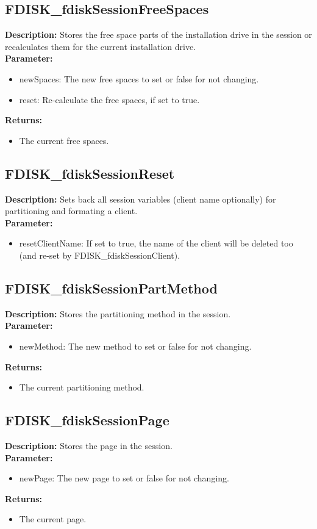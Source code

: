 \subsection{FDISK\_fdiskSessionFreeSpaces}
\textbf{Description:} Stores the free space parts of the installation drive in the session or recalculates them for the current installation drive.\\
\textbf{Parameter:}
\begin{itemize}
\item newSpaces: The new free spaces to set or false for not changing.
\item reset: Re-calculate the free spaces, if set to true.
\end{itemize}
\textbf{Returns:}
\begin{itemize}
\item The current free spaces.
\end{itemize}

\subsection{FDISK\_fdiskSessionReset}
\textbf{Description:} Sets back all session variables (client name optionally) for partitioning and formating a client.\\
\textbf{Parameter:}
\begin{itemize}
\item resetClientName: If set to true, the name of the client will be deleted too (and re-set by FDISK\_fdiskSessionClient).
\end{itemize}

\subsection{FDISK\_fdiskSessionPartMethod}
\textbf{Description:} Stores the partitioning method in the session.\\
\textbf{Parameter:}
\begin{itemize}
\item newMethod: The new method to set or false for not changing.
\end{itemize}
\textbf{Returns:}
\begin{itemize}
\item The current partitioning method.
\end{itemize}

\subsection{FDISK\_fdiskSessionPage}
\textbf{Description:} Stores the page in the session.\\
\textbf{Parameter:}
\begin{itemize}
\item newPage: The new page to set or false for not changing.
\end{itemize}
\textbf{Returns:}
\begin{itemize}
\item The current page.
\end{itemize}

